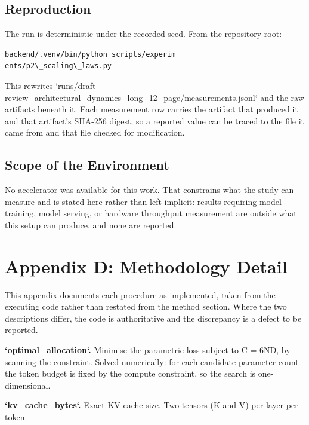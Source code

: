 \documentclass[10pt,twocolumn,letterpaper]{article}
\begin{document}
\subsection{Reproduction}


The run is deterministic under the recorded seed. From the repository root:


\begin{scriptsize}
\begin{verbatim}
backend/.venv/bin/python scripts/experim
ents/p2\_scaling\_laws.py
\end{verbatim}
\end{scriptsize}


This rewrites `runs/draft-review\_architectural\_dynamics\_long\_12\_page/measurements.jsonl` and the raw artifacts beneath it. Each measurement row carries the artifact that produced it and that artifact's SHA-256 digest, so a reported value can be traced to the file it came from and that file checked for modification.


\subsection{Scope of the Environment}


No accelerator was available for this work. That constrains what the study can measure and is stated here rather than left implicit: results requiring model training, model serving, or hardware throughput measurement are outside what this setup can produce, and none are reported.




\section{Appendix D: Methodology Detail}


This appendix documents each procedure as implemented, taken from the executing code rather than restated from the method section. Where the two descriptions differ, the code is authoritative and the discrepancy is a defect to be reported.

\textbf{`optimal\_allocation`.} Minimise the parametric loss subject to C = 6ND, by scanning the constraint. Solved numerically: for each candidate parameter count the token budget is fixed by the compute constraint, so the search is one-dimensional.

\textbf{`kv\_cache\_bytes`.} Exact KV cache size. Two tensors (K and V) per layer per token.
\end{document}

